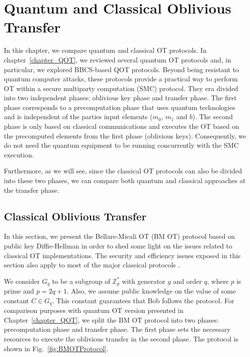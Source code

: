 


%

\chapter{Quantum and Classical Oblivious Transfer}

In this chapter, we compare quantum and classical OT protocols. In chapter~\ref{chapter_QOT}, we reviewed several quantum OT protocols and, in particular, we explored BBCS-based QOT protocols. Beyond being resistant to quantum computer attacks, these protocols provide a practical way to perform OT within a secure multiparty computation (SMC) protocol. They era divided into two independent phases: oblivious key phase and transfer phase. The first phase corresponds to a precomputation phase that uses quantum technologies and is independent of the parties input elements ($m_0$, $m_1$ and $b$). The second phase is only based on classical communications and executes the OT based on the precomputed elements from the first phase (oblivious keys). Consequently, we do not need the quantum equipment to be running concurrently with the SMC execution. 

Furthermore, as we will see, since the classical OT protocols can also be divided into these two phases, we can compare both quantum and classical approaches at the transfer phase.






\section{Classical Oblivious Transfer}


In this section, we present the Bellare-Micali OT (BM OT) protocol \cite{BM89} based on public key Diffie-Hellman in order to shed some light on the issues related to classical OT implementations. The security and efficiency issues exposed in this section also apply to most of the major classical protocols \cite{EGL85, NP01, CO15}.

We consider $G_q$ to be a subgroup of $\mathbb{Z}^*_p$ with generator $g$ and order $q$, where $p$ is prime and $p = 2q + 1$. Also, we assume public knowledge on the value of some constant $C\in G_q$. This constant guarantees that Bob follows the protocol. For comparison purposes with quantum OT version presented in Chapter~\ref{chapter_QOT}, we split the BM OT protocol into two phases: precomputation phase and transfer phase. The first phase sets the necessary resources to execute the oblivious transfer in the second phase. The protocol is shown in Fig.~\ref{fig:BMOTProtocol}.


